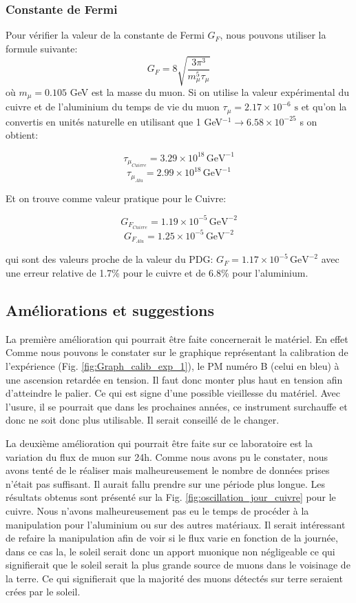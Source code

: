 \documentclass[12pt]{article}
\begin{document}
\subsubsection{Constante de Fermi}
Pour vérifier la valeur de la constante de Fermi $G_{F}$, nous pouvons utiliser la formule suivante:
\[ G_{F} =8\sqrt{\frac{3\pi^{3}}{m_{\mu}^{5}\tau_{\mu}}} \]
où $m_{\mu}=0.105$ GeV est la masse du muon.
Si on utilise la valeur expérimental du cuivre et de l'aluminium du temps de vie du muon $\tau_{\mu}=2.17\times10^{-6} \text{ s}$ et qu'on la convertis en unités naturelle en utilisant que 1 GeV$^{-1}\rightarrow6.58\times10^{-25}$ s on obtient:

\[ \tau_{\mu_{Cuivre}}=3.29\times10^{18}\,\text{GeV}^{-1}\]
\[ \tau_{\mu_{Alu}}=2.99\times10^{18}\,\text{GeV}^{-1}\]

Et on trouve comme valeur pratique pour le Cuivre:

\[ G_{F_{Cuivre}}=1.19\times10^{-5}\,\text{GeV}^{-2}\]
\[ G_{F_{Alu}}=1.25\times10^{-5}\,\text{GeV}^{-2}\]

qui sont des valeurs proche de la valeur du PDG: $G_{F}=1.17\times10^{-5}\,\text{GeV}^{-2}$ avec une erreur relative de  1.7\% pour le cuivre et de 6.8\% pour l'aluminium.


\subsection{Améliorations et suggestions}

La première amélioration qui pourrait être faite concernerait le matériel. En effet Comme nous pouvons le constater sur le graphique représentant la calibration de l'expérience (Fig. \ref{fig:Graph_calib_exp_1}), le PM numéro B (celui en bleu) à une ascension retardée en tension. Il faut donc monter plus haut en tension afin d'atteindre le palier. Ce qui est signe d'une possible vieillesse du matériel. Avec l'usure, il se pourrait que dans les prochaines années, ce instrument surchauffe et donc ne soit donc plus utilisable. Il serait conseillé de le changer. 

La deuxième amélioration qui pourrait être faite sur ce laboratoire est la variation du flux de muon sur 24h. Comme nous avons pu le constater, nous avons tenté de le réaliser mais malheureusement le nombre de données prises n'était pas suffisant. Il aurait fallu prendre sur une période plus longue. Les résultats obtenus sont présenté sur la Fig. \ref{fig:oscillation_jour_cuivre} pour le cuivre. Nous n'avons malheureusement pas eu le temps de procéder à la manipulation pour l'aluminium ou sur des autres matériaux. Il serait intéressant de refaire la manipulation afin de voir si le flux varie en fonction de la journée, dans ce cas la, le soleil serait donc un apport muonique non négligeable ce qui signifierait que le soleil serait la plus grande source de muons dans le voisinage de la terre. Ce qui signifierait que la majorité des muons détectés sur terre seraient crées par le soleil.
\end{document}
